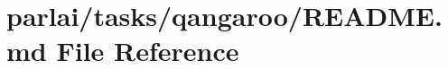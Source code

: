 \hypertarget{parlai_2tasks_2qangaroo_2README_8md}{}\section{parlai/tasks/qangaroo/\+R\+E\+A\+D\+ME.md File Reference}
\label{parlai_2tasks_2qangaroo_2README_8md}

